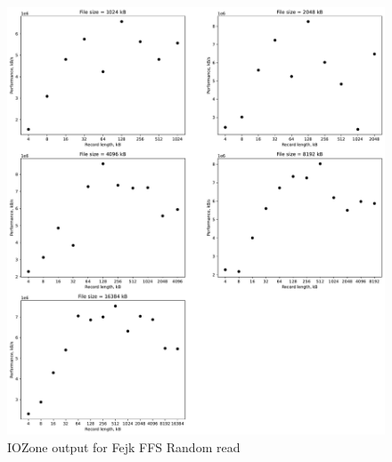 \begin{figure}[!htb]
	\label{fig:app_bench_fffs_rnd_read}
	\begin{center}
		\includegraphics[width=1.0\textwidth]{figures/benchmarking/fake-ffs/Random read.pdf}
	\end{center}
	\caption{IOZone output for Fejk \gls{FFS} Random read}
\end{figure}

